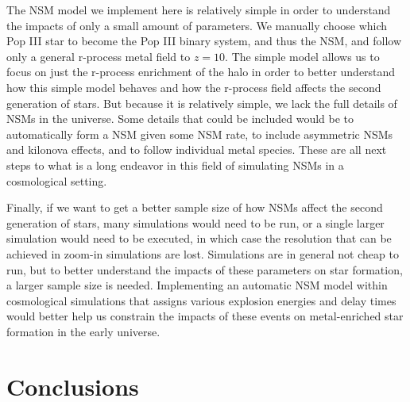 \documentclass[fleqn,usenatbib]{mnras}
\begin{document}
The NSM model we implement here is relatively simple in order to understand the impacts of only a small amount of parameters. We manually choose which Pop III star to become the Pop III binary system, and thus the NSM, and follow only a general r-process metal field to $z = 10$. The simple model allows us to focus on just the r-process enrichment of the halo in order to better understand how this simple model behaves and how the r-process field affects the second generation of stars. But because it is relatively simple, we lack the full details of NSMs in the universe. Some details that could be included would be to automatically form a NSM given some NSM rate, to include asymmetric NSMs and kilonova effects, and to follow individual metal species. These are all next steps to what is a long endeavor in this field of simulating NSMs in a cosmological setting. 

Finally, if we want to get a better sample size of how NSMs affect the second generation of stars, many simulations would need to be run, or a single larger simulation would need to be executed, in which case the resolution that can be achieved in zoom-in simulations are lost. Simulations are in general not cheap to run, but to better understand the impacts of these parameters on star formation, a larger sample size is needed. Implementing an automatic NSM model within cosmological simulations that assigns various explosion energies and delay times would better help us constrain the impacts of these events on metal-enriched star formation in the early universe.
	
\section{Conclusions} \label{sec:conclusion}
\end{document}
